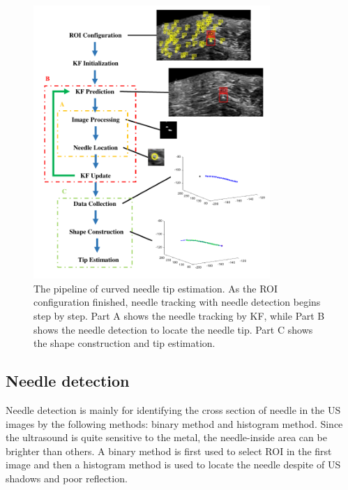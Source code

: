 \documentclass[journal,article,submit,moreauthors,pdftex]{Definitions/mdpi}
\begin{document}
\begin{figure}[H]
\centering
\includegraphics[width=0.8\textwidth]{figures/2/f2.pdf}
\captionsetup{width=16 cm,justification=centering}
\caption{ The pipeline of curved needle tip estimation. As the ROI configuration finished, needle tracking with needle detection begins step by step. Part A shows the needle tracking by KF, while Part B shows the needle detection to locate the needle tip. Part C shows the shape construction and tip estimation.}\label{fig:2}
\end{figure}

\subsection{Needle detection }
Needle detection is mainly for identifying the cross section of needle in the US images by the following methods: binary method and histogram method.
Since the ultrasound is quite sensitive to the metal, the needle-inside area can be brighter than others.
A binary method\cite{Waine2016a} is first used to select ROI in the first image and then a histogram method is used to locate the needle despite of US shadows and poor reflection.
\end{document}
